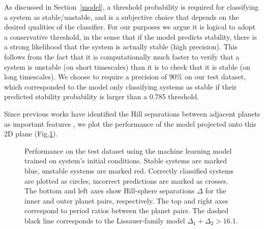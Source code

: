 As discussed in Section~\ref{model}, a threshold probability is required for classifying a system as stable/unstable, and is a subjective choice that depends on the desired qualities of the classifier.
For our purposes we argue it is logical to adopt a conservative threshold, in the sense that if the model predicts stability, there is a strong likelihood that the system is actually stable (high precision).
This follows from the fact that it is computationally much faster to verify that a system is unstable (on short timescales) than it is to check that it is stable (on long timescales).
We choose to require a precision of $90\%$ on our test dataset, which corresponded to the model only classifying systems as stable if their predicted stability probability is larger than a 0.785 threshold.

Since previous works have identified the Hill separations between adjacent planets as important features \citep{Chambers96, Marzari14}, we plot the performance of the model projected onto this 2D plane (Fig.\:\ref{ariplot}).

\begin{figure}
 \centering {}
 \caption{
     Performance on the test dataset using the machine learning model trained on system's initial conditions.
     Stable systems are marked blue, unstable systems are marked red.  
     Correctly classified systems are plotted as circles, incorrect predictions are marked as crosses.
     The bottom and left axes show Hill-sphere separations $\Delta$ for the inner and outer planet pairs, respectively.
     The top and right axes correspond to period ratios between the planet pairs.
     The dashed black line corresponds to the Lissauer-family model $\Delta_1 + \Delta_2 > 16.1$.    
    \label{ariplot}}
\end{figure}

